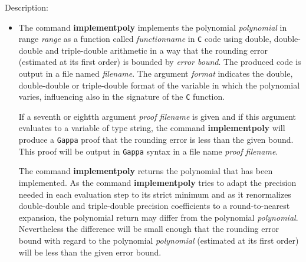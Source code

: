 \noindent Description: \begin{itemize}

\item The command \textbf{implementpoly} implements the polynomial \emph{polynomial} in range
   \emph{range} as a function called \emph{functionname} in \texttt{C} code
   using double, double-double and triple-double arithmetic in a way that
   the rounding error (estimated at its first order) is bounded by \emph{error bound}. 
   The produced code is output in a file named \emph{filename}. The
   argument \emph{format} indicates the double, double-double or triple-double
   format of the variable in which the polynomial varies, influencing
   also in the signature of the \texttt{C} function.
    
   If a seventh or eightth argument \emph{proof filename} is given and if this
   argument evaluates to a variable of type \textsf{string}, the command
   \textbf{implementpoly} will produce a \texttt{Gappa} proof that the
   rounding error is less than the given bound. This proof will be output
   in \texttt{Gappa} syntax in a file name \emph{proof filename}.
    
   The command \textbf{implementpoly} returns the polynomial that has been
   implemented. As the command \textbf{implementpoly} tries to adapt the precision
   needed in each evaluation step to its strict minimum and as it
   renormalizes double-double and triple-double precision coefficients to
   a round-to-nearest expansion, the polynomial return may differ from
   the polynomial \emph{polynomial}. Nevertheless the difference will be small
   enough that the rounding error bound with regard to the polynomial
   \emph{polynomial} (estimated at its first order) will be less than the
   given error bound.
    

\end{itemize}
